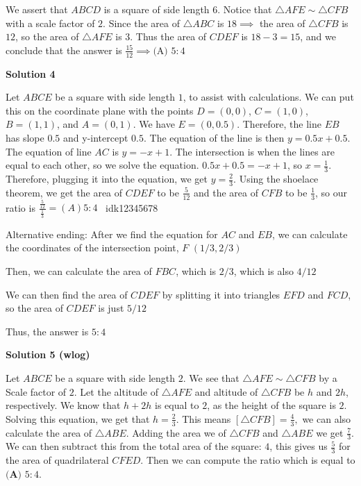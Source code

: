 \begin{enumerate}
We assert that $ABCD$ is a square of side length $6$. Notice that $\triangle AFE\sim\triangle CFB$ with a scale factor of $2$. Since the area of $\triangle ABC$ is $18 \implies$ the area of $\triangle CFB$ is $12$, so the area of $\triangle AFE$ is $3$. Thus the area of $CDEF$ is $18-3=15$, and we conclude that the answer is $\frac{15}{12}\implies\boxed{\text{(A) }5:4}$




\textbf{Solution 4}

Let $ABCE$ be a square with side length $1$, to assist with calculations. We can put this on the coordinate plane with the points $D = (0,0)$, $C = (1, 0)$, $B = (1, 1)$, and $A = (0, 1)$. We have $E = (0, 0.5)$. Therefore, the line $EB$ has slope $0.5$ and y-intercept $0.5$. The equation of the line is then $y = 0.5x + 0.5$. The equation of line $AC$ is $y = -x + 1$. The intersection is when the lines are equal to each other, so we solve the equation. $0.5x + 0.5 = -x + 1$, so $x = \frac{1}{3}$. Therefore, plugging it into the equation, we get $y= \frac{2}{3}$. Using the shoelace theorem, we get the area of $CDEF$ to be $\frac{5}{12}$ and the area of $CFB$ to be $\frac{1}{3}$, so our ratio is $\frac{\frac{5}{12}}{\frac{1}{3}} = \boxed{(A) 5:4}$ ~idk12345678

 
Alternative ending: After we find the equation for $AC$ and $EB$, we can calculate the coordinates of the intersection point, $F$ $(1/3,2/3)$

 Then, we can calculate the area of $FBC$, which is $2/3$, which is also $4/12$

 We can then find the area of $CDEF$ by splitting it into triangles $EFD$ and $FCD$, so the area of $CDEF$ is just $5/12$

 Thus, the answer is $5:4$




\textbf{Solution 5 (wlog)}

Let $ABCE$ be a square with side length $2$. We see that $\triangle AFE \sim \triangle CFB$ by a Scale factor of $2$. Let the altitude of $\triangle AFE$ and altitude of $\triangle CFB$ be $h$ and $2h$, respectively. We know that $h+2h$ is equal to $2$, as the height of the square is $2$. Solving this equation, we get that $h = \frac{2}3.$ This means $[\triangle CFB] = \frac{4}3,$ we can also calculate the area of $\triangle ABE$. Adding the area we of $\triangle CFB$ and $\triangle ABE$ we get $\frac{7}3.$ We can then subtract this from the total area of the square: $4$, this gives us $\frac{5}3$ for the area of quadrilateral $CFED.$ Then we can compute the ratio which is equal to $\boxed{\textbf{(A) } 5:4}.$


\end{enumerate}
